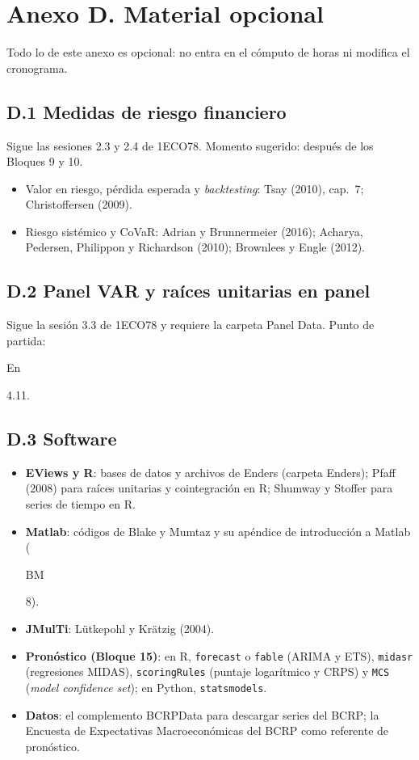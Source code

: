 \documentclass[11pt,a4paper]{article}
\newcommand{\etiqueta}[2]{%
  {\setlength{\fboxsep}{1.4pt}\colorbox{#1}{\sffamily\bfseries\color{white}\strut#2}}}
\newcommand{\EN}[1]{\etiqueta{colorEn}{En}\nobreak\hspace{0.25em}\textcolor{colorEn}{#1}}
\newcommand{\BM}[1]{\etiqueta{colorBM}{BM}\nobreak\hspace{0.25em}\textcolor{colorBM}{#1}}
\begin{document}
\section*{Anexo D. Material opcional}

Todo lo de este anexo es opcional: no entra en el cómputo de horas ni modifica
el cronograma.

\subsection*{D.1 Medidas de riesgo financiero}
Sigue las sesiones 2.3 y 2.4 de 1ECO78. Momento sugerido: después de los
Bloques 9 y 10.
\begin{itemize}[leftmargin=1.4em,itemsep=1pt]
  \item Valor en riesgo, pérdida esperada y \emph{backtesting}: Tsay (2010),
        cap.~7; Christoffersen (2009).
  \item Riesgo sistémico y CoVaR: Adrian y Brunnermeier (2016); Acharya,
        Pedersen, Philippon y Richardson (2010); Brownlees y Engle (2012).
\end{itemize}

\subsection*{D.2 Panel VAR y raíces unitarias en panel}
Sigue la sesión 3.3 de 1ECO78 y requiere la carpeta Panel Data. Punto de
partida: \EN{4.11}.

\subsection*{D.3 Software}
\begin{itemize}[leftmargin=1.4em,itemsep=1pt]
  \item \textbf{EViews y R}: bases de datos y archivos de Enders (carpeta
        Enders); Pfaff (2008) para raíces unitarias y cointegración en R;
        Shumway y Stoffer para series de tiempo en R.
  \item \textbf{Matlab}: códigos de Blake y Mumtaz y su apéndice de
        introducción a Matlab (\BM{8}).
  \item \textbf{JMulTi}: Lütkepohl y Krätzig (2004).
  \item \textbf{Pronóstico (Bloque 15)}: en R, \texttt{forecast} o
        \texttt{fable} (ARIMA y ETS), \texttt{midasr} (regresiones MIDAS),
        \texttt{scoringRules} (puntaje logarítmico y CRPS) y \texttt{MCS}
        (\emph{model confidence set}); en Python, \texttt{statsmodels}.
  \item \textbf{Datos}: el complemento BCRPData para descargar series del BCRP;
        la Encuesta de Expectativas Macroeconómicas del BCRP como referente de
        pronóstico.
\end{itemize}
\end{document}
